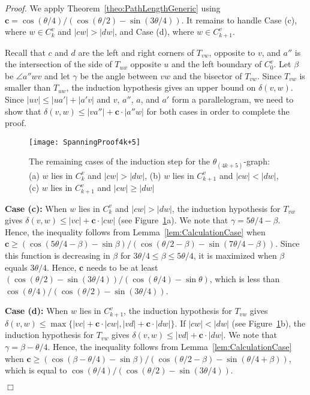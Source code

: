 \documentclass[12pt]{article}
\newenvironment{proof}{\emph{Proof.}}{\hfill $\Box$\\}
\newcommand{\graph}[1]{\ensuremath{\theta_{(4 k + #1)}}-graph\xspace}
\newcommand{\canon}[2]{\ensuremath{T_{#1 #2}}}
\newcommand{\const}{\ensuremath{\boldsymbol{c}}\xspace}
\begin{document}
\begin{proof}
  We apply Theorem~\ref{theo:PathLengthGeneric} using $\const = \cos (\theta/4) / (\cos (\theta/2) - \sin (3\theta/4))$. It remains to handle Case (c), where $w \in C_k^v$ and $|c w| > |d w|$, and Case (d), where $w \in C_{k+1}^v$. 

  Recall that $c$ and $d$ are the left and right corners of \canon{v}{w}, opposite to $v$, and $a''$ is the intersection of the side of $\canon{u}{w}$ opposite $u$ and the left boundary of $C_0^v$. Let $\beta$ be $\angle a'' w v$ and let $\gamma$ be the angle between $v w$ and the bisector of \canon{v}{w}. Since \canon{v}{w} is smaller than \canon{u}{w}, the induction hypothesis gives an upper bound on $\delta(v, w)$. Since $|u v| \leq |u a'| + |a' v|$ and $v$, $a''$, $a$, and $a'$ form a parallelogram, we need to show that $\delta(v, w) \leq |v a''| + \const \cdot |a'' w|$ for both cases in order to complete the proof. 

  \begin{figure}[ht]
    \begin{center}
      \texttt{[image: SpanningProof4k+5]}
    \end{center}
    \caption{The remaining cases of the induction step for the \graph{5}: (a) $w$ lies in $C_k^v$ and $|c w| > |d w|$, (b) $w$ lies in $C_{k+1}^v$ and $|c w| < |d w|$, (c) $w$ lies in $C_{k+1}^v$ and $|c w| \geq |d w|$}
    \label{fig:SpanningProof4k+5}
  \end{figure}

  \textbf{Case (c):} When $w$ lies in $C_k^v$ and $|c w| > |d w|$, the induction hypothesis for \canon{v}{w} gives $\delta(v, w) \leq |v c| + \const \cdot |c w|$ (see Figure~\ref{fig:SpanningProof4k+5}a). We note that $\gamma = 5\theta/4 - \beta$. Hence, the inequality follows from Lemma~\ref{lem:CalculationCase} when $\const \geq (\cos (5\theta/4 - \beta) - \sin \beta) / (\cos (\theta/2 - \beta) - \sin (7\theta/4 - \beta))$. Since this function is decreasing in $\beta$ for $3\theta/4 \leq \beta \leq 5\theta/4$, it is maximized when $\beta$ equals $3\theta/4$. Hence, $\const$ needs to be at least $(\cos (\theta/2) - \sin (3\theta/4)) / (\cos (\theta/4) - \sin \theta)$, which is less than $\cos (\theta/4) / (\cos (\theta/2) - \sin (3\theta/4))$. 

  \textbf{Case (d):} When $w$ lies in $C_{k+1}^v$, the induction hypothesis for \canon{v}{w} gives $\delta(v, w) \leq \max\{|v c| + \const \cdot |c w|, |v d| + \const \cdot |d w|\}$. If $|c w| < |d w|$ (see Figure~\ref{fig:SpanningProof4k+5}b), the induction hypothesis for \canon{v}{w} gives $\delta(v, w) \leq |v d| + \const \cdot |d w|$. We note that $\gamma = \beta - \theta/4$. Hence, the inequality follows from Lemma~\ref{lem:CalculationCase} when $\const \geq (\cos (\beta - \theta/4) - \sin \beta) / (\cos (\theta/2 - \beta) - \sin (\theta/4 + \beta))$, which is equal to $\cos (\theta/4) / (\cos (\theta/2) - \sin (3\theta/4))$. 


\end{proof}
\end{document}

